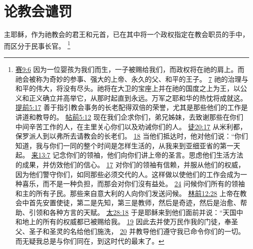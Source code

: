 \documentclass[12pt, a4paper, oneside]{ctexart}
\newcounter{parnum}[section]
\newcommand{\N}{%
   \noindent\refstepcounter{parnum}%
    \makebox[\parindent][l]{\textbf{\arabic{parnum}.}}}
\begin{document}
\section{论教会谴罚}

\N 主耶稣，作为祂教会的君王和元首，已在其中将一个政权指定在教会职员的手中，而区分于民事长官。
	\footnote {
		\href{https://biblehub.com/isaiah/9-6.htm}{赛9:6} 因为一位婴孩为我们而生，一子被赐给我们，而政权将在祂的肩上。而祂会被称为奇妙的参事、强大的上帝、永久的父、和平的王子。
		\href{https://biblehub.com/isaiah/9-7.htm}{7} 祂的治理与和平的伟大，将没有尽头。祂将在大卫的宝座上并在祂的国度之上为王，以公义和正义确立并高举它，从那时起直到永远。万军之耶和华的热忱将成就这。
		\href{https://biblehub.com/1_timothy/5-17.htm}{提前5:17} 善于指引教会事务的长老配得双倍的荣誉，尤其是那些他们的工作是讲道和教导的。
		\href{https://biblehub.com/1_thessalonians/5-12.htm}{帖前5:12} 现在我们企求你们，弟兄姊妹，去致谢那些在你们中间辛苦工作的人，在主里关心你们以及劝诫你们的人。
		\href{https://biblehub.com/acts/20-17.htm}{徒20:17} 从米利都，保罗派人到以弗所去请教会的长老们。
		\href{https://biblehub.com/acts/20-18.htm}{18} 当他们抵达时，他对他们说：“你们知道，我与你们一同的整个时间是怎样生活的，从我来到亚细亚省的第一天起。
		\href{https://biblehub.com/hebrews/13-7.htm}{来13:7} 记念你们的领袖，他们向你们讲上帝的圣言。思虑他们生活方法的成果，并仿效他们的信心。
		\href{https://biblehub.com/hebrews/13-17.htm}{17} 对你们的领袖有信赖，并服从他们的权威，因为他们警守你们，如同那些必须交代的人。这样做以使他们的工作会成为一种喜乐，而不是一种负担，而那会对你们沒有益处。
		\href{https://biblehub.com/hebrews/13-24.htm}{24} 问候你们所有的领袖和主的所有子民。那些来自意大利的人向你们发送问候。
		\href{https://biblehub.com/1_corinthians/12-28.htm}{林前12:28} 上帝在教会中首先安置使徒，第二是先知，第三是教师，然后是奇迹，然后是治愈、帮助、引领和各种方言的天赋。
		\href{https://biblehub.com/matthew/28-18.htm}{太28:18} 于是耶稣来到他们面前并说：“天国中和地上的所有的权威都已被赐给我。
		\href{https://biblehub.com/matthew/28-19.htm}{19} 因此去并使万民作我的门徒，奉圣父、圣子和圣灵的名给他们施洗，
		\href{https://biblehub.com/matthew/28-20.htm}{20} 并教导他们遵守我已命令你们的一切。而无疑我总是与你们同在，到这时代的最末了。
	}
\end{document}
